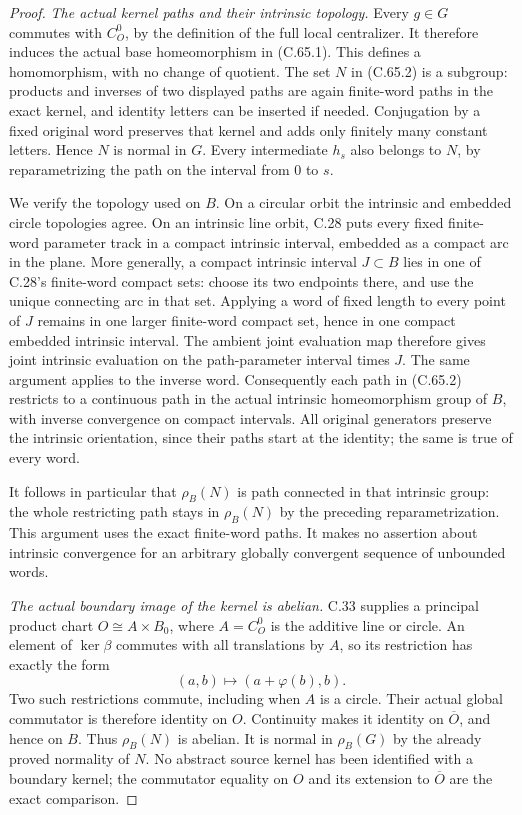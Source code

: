 \begin{proof}
\emph{The actual kernel paths and their intrinsic topology.}
Every $g\in G$ commutes with $C_O^0$, by the definition
of the full local centralizer. It therefore induces
the actual base homeomorphism in (C.65.1). This
defines a homomorphism, with no change of quotient.
The set $N$ in (C.65.2) is a subgroup: products
and inverses of two displayed paths are again
finite-word paths in the exact kernel, and
identity letters can be inserted if needed.
Conjugation by a fixed original word preserves
that kernel and adds only finitely many constant
letters. Hence $N$ is normal in $G$.
Every intermediate $h_s$ also belongs to $N$,
by reparametrizing the path on the interval from
$0$ to $s$.

We verify the topology used on $B$. On a circular
orbit the intrinsic and embedded circle topologies
agree. On an intrinsic line orbit, C.28 puts every
fixed finite-word parameter track in a compact
intrinsic interval, embedded as a compact arc in
the plane. More generally, a compact intrinsic
interval $J\subset B$ lies in one of C.28's
finite-word compact sets: choose its two endpoints
there, and use the unique connecting arc in that
set. Applying a word of fixed length to every
point of $J$ remains in one larger finite-word
compact set, hence in one compact embedded
intrinsic interval. The ambient joint evaluation
map therefore gives joint intrinsic evaluation
on the path-parameter interval times $J$.
The same argument applies to the inverse word.
Consequently each path in (C.65.2) restricts to
a continuous path in the actual intrinsic
homeomorphism group of $B$, with inverse
convergence on compact intervals. All original
generators preserve the intrinsic orientation,
since their paths start at the identity; the
same is true of every word.

It follows in particular that $\rho_B(N)$ is
path connected in that intrinsic group: the
whole restricting path stays in $\rho_B(N)$
by the preceding reparametrization. This argument
uses the exact finite-word paths. It makes no
assertion about intrinsic convergence for an
arbitrary globally convergent sequence of
unbounded words.

\emph{The actual boundary image of the kernel is abelian.}
C.33 supplies a principal product chart
$O\cong A\times B_0$, where $A=C_O^0$ is the
additive line or circle. An element of
$\ker\beta$ commutes with all translations
by $A$, so its restriction has exactly the form
\[
                 (a,b)\longmapsto(a+\varphi(b),b).
                                                               \tag{C.65.5}
\]
Two such restrictions commute, including when
$A$ is a circle. Their actual global commutator
is therefore identity on $O$. Continuity makes
it identity on $\overline O$, and hence on $B$.
Thus $\rho_B(N)$ is abelian. It is normal in
$\rho_B(G)$ by the already proved normality of
$N$. No abstract source kernel has been
identified with a boundary kernel; the
commutator equality on $O$ and its extension
to $\overline O$ are the exact comparison.


\end{proof}
